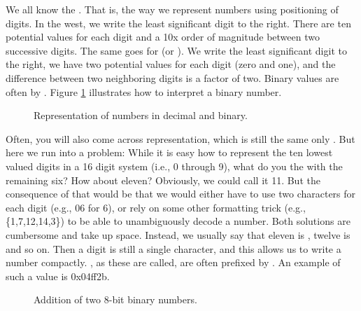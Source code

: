 We all know the . That is, the way we represent numbers using  positioning of digits. In the west, we write the least significant digit to the right. There are ten potential values for each digit and a 10x order of magnitude between two successive digits. The same goes for  (or ). We write the least significant digit to the right, we have two potential values for each digit (zero and one), and the difference between two neighboring digits is a factor of two. Binary values are often  by . Figure \ref{fig:prim:int:repr:base} illustrates how to interpret a binary number.

\begin{figure}[tbp]
  
  \caption{Representation of numbers in decimal and binary.}
  \label{fig:prim:int:repr:base}
\end{figure}

Often, you will also come across  representation, which is still the same only . But here we run into a problem: While it is easy how to represent the ten lowest valued digits in a 16 digit system (i.e., 0 through 9), what do you the with the remaining six? How about eleven? Obviously, we could call it 11. But the consequence of that would be that we would either have to use two characters for each digit (e.g., 06 for 6), or rely on some other formatting trick (e.g., \{1,7,12,14,3\}) to be able to unambiguously decode a number. Both solutions are cumbersome and take up space. Instead, we usually say that eleven is , twelve is  and so on. Then a digit is still a single character, and this allows us to write a number compactly. , as these are called, are often prefixed by . An example of such a value is 0x04ff2b.



\begin{figure}[tbp]
  
  \caption{Addition of two 8-bit binary numbers.}
  \label{fig:prim:int:binary:add}
\end{figure}

